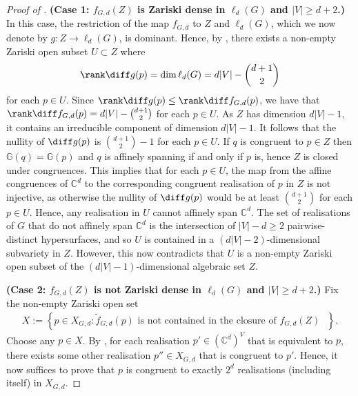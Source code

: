 \begin{proof}[Proof of ]
	\textbf{(Case 1: $f_{G,d}(Z)$ is Zariski dense in $\ell_d(G)$ and $|V| \geq d+2$.)}
	In this case,
	the restriction of the map $f_{G,d}$ to $Z$ and $\ell_d(G)$, which we now denote by $g : Z \rightarrow \ell_d(G)$, is dominant.
	Hence, by ,
	there exists a non-empty Zariski open subset $U \subset Z$ where 
	\begin{align*}
		\rank \diff g(p) = \dim \ell_d(G) = d|V|- \binom{d+1}{2}
	\end{align*}
	for each $p \in U$.
	Since $\rank \diff g(p) \leq \rank \diff f_{G,d}(p)$,
	we have that $\rank \diff f_{G,d}(p) = d|V| - \binom{d+1}{2}$ for each $p \in U$.
	As $Z$ has dimension $d|V|-1$,
	it contains an irreducible component of dimension $d|V|-1$.
	It follows that the nullity of $\diff g(p)$ is $\binom{d+1}{2} - 1$ for each $p \in U$.	
	If $q$ is congruent to $p \in Z$ then $\mathbb{G}(q) = \mathbb{G}(p)$ and $q$ is affinely spanning if and only if $p$ is,
	hence $Z$ is closed under congruences.
	This implies that for each $p \in U$,
	the map from the affine congruences of $\mathbb{C}^d$ to the corresponding congruent realisation of $p$ in $Z$ is not injective,
	as otherwise the nullity of $\diff g(p)$ would be at least $\binom{d+1}{2}$ for each $p \in U$.
	Hence, any realisation in $U$ cannot affinely span $\mathbb{C}^d$.
	The set of realisations of $G$ that do not affinely span $\mathbb{C}^d$ is the intersection of $|V| - d \geq 2$ pairwise-distinct hypersurfaces,
	and so $U$ is contained in a $(d|V|-2)$-dimensional subvariety in $Z$.
	However, this now contradicts that $U$ is a non-empty Zariski open subset of the $(d|V|-1)$-dimensional algebraic set $Z$.
	
	
	\textbf{(Case 2: $f_{G,d}(Z)$ is not Zariski dense in $\ell_d(G)$ and $|V| \geq d+2$.)}
	Fix the non-empty Zariski open set
	\begin{align*}
		X := \left\{ p \in X_{G,d} : \tilde{f}_{G,d}(p) \text{ is not contained in the closure of $f_{G,d}(Z)$ }   \right\}.
	\end{align*}
	Choose any $p \in X$.
	By , for each realisation $p' \in (\mathbb{C}^d)^V$ that is equivalent to $p$,
	there exists some other realisation $p'' \in X_{G,d}$ that is congruent to $p'$.
	Hence, it now suffices to prove that $p$ is congruent to exactly $2^d$ realisations (including itself) in $X_{G,d}$.
	

\end{proof}
